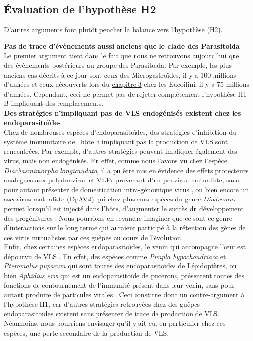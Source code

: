\subsection{Évaluation de l'hypothèse H2}

D'autres arguments font plutôt pencher la balance vers l'hypothèse (H2). 

\textbf{Pas de trace d'évènements aussi anciens que le clade des Parasitoida}\\
Le premier argument tient dans le fait que nous ne retrouvons aujourd'hui que des évènements postérieurs au groupe des Parasitoida. Par exemple, les plus anciens cas décrits à ce jour sont ceux des Microgastroïdes, il y a 100 millions d'années \citep{whitfield_virus_2003, bezier_bracovirus_2008, murphy_phylogeny_2008} et ceux découverts lors du \hyperref[sec:chap3]{chapitre 3} chez les Eucoilini, il y a 75 millions d'années. Cependant, ceci ne permet pas de rejeter complètement l'hypothèse H1-B impliquant des remplacements. \\

\textbf{Des stratégies n'impliquant pas de VLS endogénisés existent chez les endoparasitoïdes}\\
Chez de nombreuses espèces d'endoparasitoïdes, des stratégies d'inhibition du système immunitaire de l'hôte n'impliquant pas la production de VLS sont rencontrées. 
Par exemple, d'autres stratégies peuvent impliquer également des virus, mais non endogénisés. En effet, comme nous l'avons vu chez l'espèce \textit{Diachasmimorpha longicaudata}, il a pu être mis en évidence des effets protecteurs analogues aux polydnavirus et VLPs provenant d'un poxvirus mutualiste, sans pour autant présenter de domestication intra-génomique virus \citep{coffman_mutualistic_2020,coffman_viral_2022}, ou bien encore un ascovirus mutualiste (DpAV4) qui chez plusieurs espèces du genre \textit{Diadromus} permet lorsqu'il est injecté dans l'hôte, d'augmenter le succès du développement des progénitures \citep{stasiak_characteristics_2005}. Nous pourrions en revanche imaginer que ce sont ce genre d'interactions sur le long terme qui auraient participé à la rétention des gènes de ces virus mutualistes par ces guêpes au cours de l'évolution. \\

Enfin, chez certaines espèces endoparasitoïdes, le venin qui accompagne l'œuf est dépourvu de VLS \citep{moreau_venom_2015}. En effet, des espèces comme \textit{Pimpla hypochondriaca} et \textit{Pteromalus puparum} qui sont toutes des endoparasitoïdes de Lépidoptères, ou bien \textit{Aphidius ervi} qui est un endoparasitoïde de pucerons, présentent toutes des fonctions de contournement de l'immunité présent dans leur venin, sans pour autant produire de particules virales \citep{moreau_venom_2015}. Ceci constitue donc un contre-argument à l'hypothèse H1, car d'autres stratégies retrouvées chez des guêpes endoparasitoïdes existent sans présenter de trace de production de VLS. Néanmoins, nous pourrions envisager qu'il y ait eu, en particulier chez ces espèces, une perte secondaire de la production de VLS.\\ 

